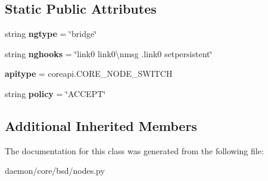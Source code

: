 \subsection*{Static Public Attributes}
\begin{DoxyCompactItemize}
\item 
\hypertarget{classcore_1_1bsd_1_1nodes_1_1_switch_node_a65666b9971b2d53e34bae7b582d18692}{string {\bfseries ngtype} = \char`\"{}bridge\char`\"{}}\label{classcore_1_1bsd_1_1nodes_1_1_switch_node_a65666b9971b2d53e34bae7b582d18692}

\item 
\hypertarget{classcore_1_1bsd_1_1nodes_1_1_switch_node_a91fa3d980880a12fdc3f97789110e964}{string {\bfseries nghooks} = \char`\"{}link0 link0\textbackslash{}nmsg .link0 setpersistent\char`\"{}}\label{classcore_1_1bsd_1_1nodes_1_1_switch_node_a91fa3d980880a12fdc3f97789110e964}

\item 
\hypertarget{classcore_1_1bsd_1_1nodes_1_1_switch_node_ab58a14bbf5a354e8edaee15ab6de5ed3}{{\bfseries apitype} = coreapi.\+C\+O\+R\+E\+\_\+\+N\+O\+D\+E\+\_\+\+S\+W\+I\+T\+C\+H}\label{classcore_1_1bsd_1_1nodes_1_1_switch_node_ab58a14bbf5a354e8edaee15ab6de5ed3}

\item 
\hypertarget{classcore_1_1bsd_1_1nodes_1_1_switch_node_a9c8d292ec937c42461496d51eafad041}{string {\bfseries policy} = \char`\"{}A\+C\+C\+E\+P\+T\char`\"{}}\label{classcore_1_1bsd_1_1nodes_1_1_switch_node_a9c8d292ec937c42461496d51eafad041}

\end{DoxyCompactItemize}
\subsection*{Additional Inherited Members}


The documentation for this class was generated from the following file\+:\begin{DoxyCompactItemize}
\item 
daemon/core/bsd/nodes.\+py\end{DoxyCompactItemize}
